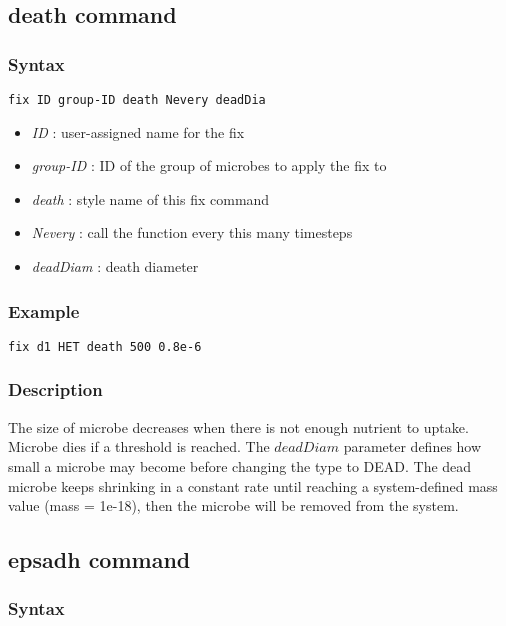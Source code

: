 \documentclass[11pt,a4paper,openright]{article}
\begin{document}
\subsection{death command}
\subsubsection*{Syntax}

\begin{Verbatim}[frame=single]
	fix ID group-ID death Nevery deadDia
\end{Verbatim}

\begin{itemize}
\item
	{\it ID }: user-assigned name for the fix
\item
	{\it group-ID }: ID of the group of microbes to apply the fix to
\item
	{\it death }: style name of this fix command
\item
	{\it Nevery }: call the function every this many timesteps
\item
	{\it deadDiam }: death diameter

\end{itemize}

\subsubsection*{Example}

\begin{Verbatim}[frame=single]
	fix d1 HET death 500 0.8e-6
\end{Verbatim}

\subsubsection*{Description}

The size of microbe decreases when there is not enough nutrient to uptake. Microbe dies if a threshold is reached. The $deadDiam$ parameter defines how small a microbe may become before changing the type to DEAD. The dead microbe keeps shrinking in a constant rate until reaching a system-defined mass value (mass = 1e-18), then the microbe will be removed from the system.

\newpage
\subsection{epsadh command}

\subsubsection*{Syntax}
\end{document}
